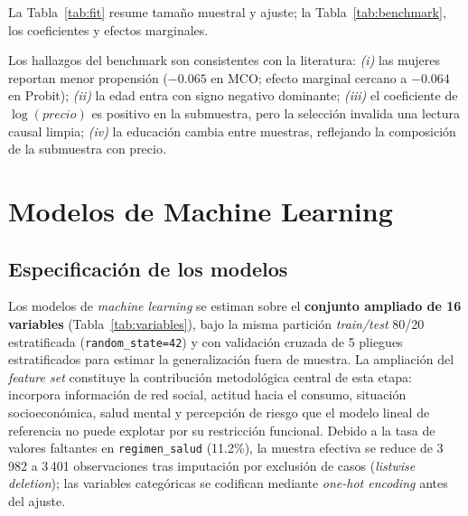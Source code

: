 \documentclass[12pt, a4paper]{article}
\begin{document}
La Tabla~\ref{tab:fit} resume tamaño muestral y ajuste; la Tabla~\ref{tab:benchmark}, los coeficientes y efectos marginales.

\begin{table}[H]
\centering
\caption{Resumen de muestra y ajuste}
\label{tab:fit}

\end{table}

\begin{table}[H]
\centering
\small
\caption{Resultados comparados de benchmark}
\label{tab:benchmark}

\end{table}

Los hallazgos del benchmark son consistentes con la literatura: \emph{(i)} las mujeres reportan menor propensión (\(-0.065\) en MCO; efecto marginal cercano a \(-0.064\) en Probit); \emph{(ii)} la edad entra con signo negativo dominante; \emph{(iii)} el coeficiente de \(\log(precio)\) es positivo en la submuestra, pero la selección invalida una lectura causal limpia; \emph{(iv)} la educación cambia entre muestras, reflejando la composición de la submuestra con precio.

\section{Modelos de Machine Learning}\label{sec:ml}

\subsection{Especificación de los modelos}

Los modelos de \textit{machine learning} se estiman sobre el \textbf{conjunto ampliado de 16 variables} (Tabla~\ref{tab:variables}), bajo la misma partición \textit{train/test} 80/20 estratificada (\texttt{random\_state=42}) y con validación cruzada de 5 pliegues estratificados para estimar la generalización fuera de muestra. La ampliación del \textit{feature set} constituye la contribución metodológica central de esta etapa: incorpora información de red social, actitud hacia el consumo, situación socioeconómica, salud mental y percepción de riesgo que el modelo lineal de referencia no puede explotar por su restricción funcional. Debido a la tasa de valores faltantes en \texttt{regimen\_salud} (11.2\%), la muestra efectiva se reduce de 3\,982 a 3\,401 observaciones tras imputación por exclusión de casos (\textit{listwise deletion}); las variables categóricas se codifican mediante \textit{one-hot encoding} antes del ajuste.
\end{document}

